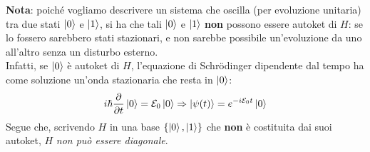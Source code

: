 \documentclass[../../InformazioneQuantistica.tex]{subfiles}
\begin{document}
\textbf{Nota}: poiché vogliamo descrivere un sistema che oscilla (per evoluzione unitaria) tra due stati $\Ket{0}$ e $\Ket{1}$, si ha che tali $\Ket{0}$ e $\Ket{1}$ \textbf{non} possono essere autoket di $H$: se lo fossero sarebbero stati stazionari, e non sarebbe possibile un'evoluzione da uno all'altro senza un disturbo esterno.\\
Infatti, se $\Ket{0}$ è autoket di $H$, l'equazione di Schr\"odinger dipendente dal tempo ha come soluzione un'onda stazionaria che resta in $\Ket{0}$:
\begin{align*}
i\hbar \frac{\partial}{\partial t} \Ket{0} =\mathcal{E}_0 \Ket{0}\Rightarrow \Ket{\psi(t)}=e^{-i\mathcal{E}_0t}\Ket{0}
\end{align*}
Segue che, scrivendo $H$ in una base $\{\Ket{0},\Ket{1}\}$ che \textbf{non} è costituita dai suoi autoket, $H$ \textit{non può essere diagonale}.\\
\end{document}
